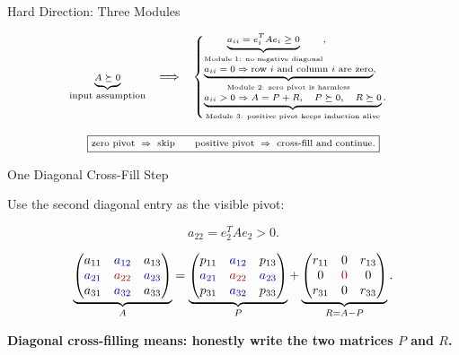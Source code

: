 \documentclass[10pt]{beamer}
\theoremstyle{definition}
\newcommand{\x}[1]{\alert{\textbf{#1}}}
\newcommand{\rd}[1]{{\color{red!70!black}#1}}
\newcommand{\bl}[1]{{\color{blue!70!black}#1}}
\begin{document}
\begin{frame}[shrink=8]{Hard Direction: Three Modules}

\[
\scriptsize
\underbrace{A\succeq0}_{\text{input assumption}}
\quad\Longrightarrow\quad
\begin{cases}
\underbrace{a_{ii}=e_i^TAe_i\ge0}_{\text{Module 1: no negative diagonal}},\\[0.5em]
\underbrace{a_{ii}=0\Rightarrow \text{row }i\text{ and column }i\text{ are zero}}_{\text{Module 2: zero pivot is harmless}},\\[0.5em]
\underbrace{a_{ii}>0\Rightarrow A=P+R,\quad P\succeq0,\quad R\succeq0}_{\text{Module 3: positive pivot keeps induction alive}}.
\end{cases}
\]

\vfill

\[
\scriptsize
\boxed{
\text{zero pivot }\Rightarrow\text{ skip}
\qquad
\text{positive pivot }\Rightarrow\text{ cross-fill and continue}.}
\]

\end{frame}


\begin{frame}{One Diagonal Cross-Fill Step}

Use the second diagonal entry as the visible pivot:

$$
a_{22}=e_2^TAe_2>0.
$$

\vfill

\[
\underbrace{
\begin{pmatrix}
a_{11}&\bl{a_{12}}&a_{13}\\
\bl{a_{21}}&\rd{a_{22}}&\bl{a_{23}}\\
a_{31}&\bl{a_{32}}&a_{33}
\end{pmatrix}}_{A}
=
\underbrace{
\begin{pmatrix}
p_{11}&\bl{a_{12}}&p_{13}\\
\bl{a_{21}}&\rd{a_{22}}&\bl{a_{23}}\\
p_{31}&\bl{a_{32}}&p_{33}
\end{pmatrix}}_{P}
+
\underbrace{
\begin{pmatrix}
r_{11}&0&r_{13}\\
0&\rd{0}&0\\
r_{31}&0&r_{33}
\end{pmatrix}}_{R=A-P}.
\]

\vfill

\begin{center}
\x{Diagonal cross-filling means: honestly write the two matrices $P$ and $R$.}
\end{center}

\end{frame}
\end{document}

